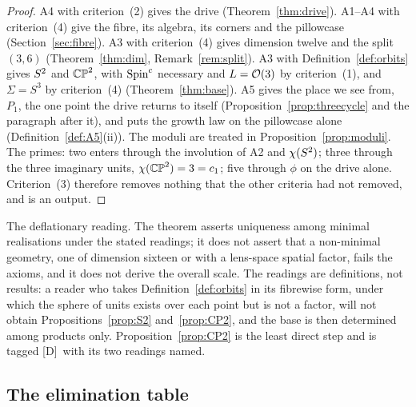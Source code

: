 \documentclass[11pt,a4paper]{article}
\theoremstyle{plain}
\theoremstyle{definition}
\theoremstyle{remark}
\newcommand{\rigD}{[\textup{D}]}
\begin{document}
\begin{proof}
A4 with criterion~(2) gives the drive (Theorem~\ref{thm:drive}). A1--A4 with criterion~(4) give the fibre, its algebra, its corners and the pillowcase (Section~\ref{sec:fibre}). A3 with criterion~(4) gives dimension twelve and the split $(3,6)$ (Theorem~\ref{thm:dim}, Remark~\ref{rem:split}). A3 with Definition~\ref{def:orbits} gives $S^2$ and $\mathbb{CP}^2$, with $\text{Spin}^c$ necessary and $L=\mathcal{O}(3)$ by criterion~(1), and $\Sigma=S^{3}$ by criterion~(4) (Theorem~\ref{thm:base}). A5 gives the place we see from, $P_{1}$, the one point the drive returns to itself (Proposition~\ref{prop:threecycle} and the paragraph after it), and puts the growth law on the pillowcase alone (Definition~\ref{def:A5}(ii)). The moduli are treated in Proposition~\ref{prop:moduli}. The primes: two enters through the involution of A2 and $\chi(S^2)$; three through the three imaginary units, $\chi(\mathbb{CP}^2)=3=c_{1}$; five through $\phi$ on the drive alone. Criterion~(3) therefore removes nothing that the other criteria had not removed, and is an output.
\end{proof}

The deflationary reading. The theorem asserts uniqueness among minimal realisations under the stated readings; it does not assert that a non-minimal geometry, one of dimension sixteen or with a lens-space spatial factor, fails the axioms, and it does not derive the overall scale. The readings are definitions, not results: a reader who takes Definition~\ref{def:orbits} in its fibrewise form, under which the sphere of units exists over each point but is not a factor, will not obtain Propositions~\ref{prop:S2} and~\ref{prop:CP2}, and the base is then determined among products only. Proposition~\ref{prop:CP2} is the least direct step and is tagged \rigD\ with its two readings named.

\subsection{The elimination table}
\end{document}
